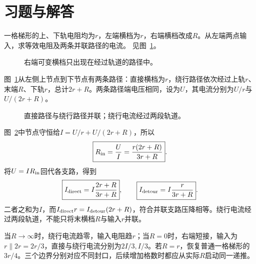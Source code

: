 

\section{习题与解答}

\begin{exercise}[有限梯形末端的可变封口]\label{ex:c3-h1}
一格梯形的上、下轨电阻均为$r$，左端横档为$r$，右端横档改成$R$。从左端两点输入，求等效电阻及两条并联路径的电流。 见图~\ref{fig:c3-h1-q}。
\end{exercise}

\begin{figure}[H]\centering
{}
\caption{右端可变横档只出现在经过轨道的路径中。}\label{fig:c3-h1-q}
\end{figure}
\begin{solution}
图~\ref{fig:c3-h1-q}从左侧上节点到下节点有两条路径：直接横档为$r$，绕行路径依次经过上轨$r$、末端$R$、下轨$r$，总计$2r+R$。两条路径端电压相同，设为$U$，其电流分别为$U/r$与$U/(2r+R)$。
\begin{figure}[H]\centering
{}
\caption{直接路径与绕行路径并联；绕行电流经过两段轨道。}\label{fig:c3-h1-s}
\end{figure}
图~\ref{fig:c3-h1-s}中节点守恒给$I=U/r+U/(2r+R)$，所以
\[
 \boxed{R_{\rm in}=\frac UI=\frac{r(2r+R)}{3r+R}}.
\]
将$U=IR_{\rm in}$回代各支路，得到
\[
 \boxed{I_{\rm direct}=I\frac{2r+R}{3r+R}},\qquad
 \boxed{I_{\rm detour}=I\frac r{3r+R}}.
\]
二者之和为$I$，而$I_{\rm direct}r=I_{\rm detour}(2r+R)$，符合并联支路压降相等。绕行电流经过两段轨道，不能只将末横档$R$与输入$r$并联。

当$R\to\infty$时，绕行电流趋零，输入电阻趋$r$；当$R=0$时，右端短接，输入为$r\parallel2r=2r/3$，直接与绕行电流分别为$2I/3,I/3$。若$R=r$，恢复普通一格梯形的$3r/4$。三个边界分别对应不同封口，后续增加格数时都应从实际$R$启动同一递推。
\end{solution}

